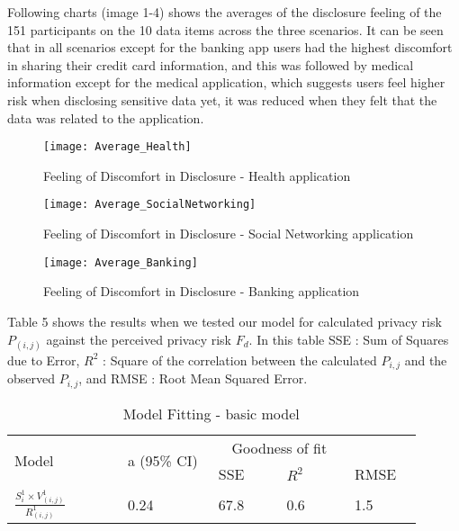 \documentclass[10pt]{article}
\begin{document}
Following charts (image 1-4) shows the averages of the disclosure feeling of the 151 participants on the 10 data items across the three scenarios. It can be seen that in all scenarios except for the banking app users had the highest discomfort in sharing their credit card information, and this was followed by medical information except for the medical application, which suggests users feel higher risk when disclosing sensitive data yet, it was reduced when they felt that the data was related to the application.

\begin{figure}[h]
\begin{center}
\texttt{[image: Average\_Health]}
\caption{Feeling of Discomfort in Disclosure - Health  application}
\end{center}
\end{figure}

\begin{figure}[h]
\begin{center}
\texttt{[image: Average\_SocialNetworking]}
\caption{Feeling of Discomfort in Disclosure - Social Networking application}
\end{center}
\end{figure}

\begin{figure}[h]
\begin{center}
\texttt{[image: Average\_Banking]}
\caption{Feeling of Discomfort in Disclosure - Banking application}
\end{center}
\end{figure}


Table 5 shows the results when we tested our model for calculated privacy risk $P_{(i,j)}$ against the perceived privacy risk $F_d$. In this table SSE : Sum of Squares due to Error, $R^2$ : Square of the correlation between the calculated $P_{i,j}$ and the observed $P_{i,j}$, and RMSE : Root Mean Squared Error.

\begin{center}
\begin{table}[H]
\caption{Model Fitting - basic model}
\begin{center}
\begin{adjustbox}{width=0.5\textwidth} 
\begin{tabular}{|p{0.25\linewidth}|p{0.2\linewidth}|p{0.15\linewidth}|p{0.15\linewidth}|p{0.15\linewidth}|} 
\hline
\multirow{2}{*}{Model}&\multirow{2}{*}{a (95\% CI)}& \multicolumn{2}{c}{Goodness of fit} &\\   \cline{3-5}
& & SSE& $R^2$& RMSE\\
\hline
$\frac{S_{i}^1 \times V_{(i,j)}^1}{R_{(i,j)}^1}$  & 0.24 &67.8 & 0.6 & 1.5 \\
\hline
\end{tabular}
\end{adjustbox}
\end{center}
\end{table}
\end{center} 
\end{document}
